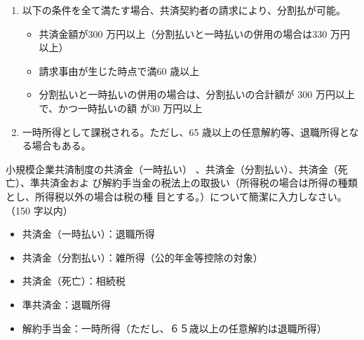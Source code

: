 \begin{answerbox}
  \begin{enumerate}[(1)]
    \item 以下の条件を全て満たす場合、共済契約者の請求により、分割払が可能。
    \begin{itemize}
      \item 共済金額が300 万円以上（分割払いと一時払いの併用の場合は330 万円以上）
      \item 請求事由が生じた時点で満60 歳以上
      \item 分割払いと一時払いの併用の場合は、分割払いの合計額が 300 万円以上で、かつ一時払いの額
      が30 万円以上
    \end{itemize}
    \item 一時所得として課税される。ただし、65 歳以上の任意解約等、退職所得となる場合もある。

  \end{enumerate}
\end{answerbox}

\begin{shortanswer}[年金1 2025 問題2(5)]
  小規模企業共済制度の共済金（一時払い） 、共済金（分割払い）、共済金（死亡）、準共済金およ
び解約手当金の税法上の取扱い（所得税の場合は所得の種類とし、所得税以外の場合は税の種
目とする。）について簡潔に入力しなさい。 （150 字以内）
\end{shortanswer}

\begin{answerbox}
  \begin{itemize}
    \item 共済金（一時払い）：退職所得
\item 共済金（分割払い）：雑所得（公的年金等控除の対象）
\item 共済金（死亡）：相続税
\item 準共済金：退職所得
\item 解約手当金：一時所得（ただし、６５歳以上の任意解約は退職所得）
  \end{itemize}
\end{answerbox}

\newpage